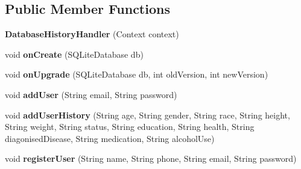 \subsection*{Public Member Functions}
\begin{DoxyCompactItemize}
\item 
{\bfseries Database\+History\+Handler} (Context context)\hypertarget{classcom_1_1example_1_1android_1_1wearable_1_1wcldemo_1_1helper_1_1DatabaseHistoryHandler_a862bdb105fc542bed99af9d6bf2f515b}{}\label{classcom_1_1example_1_1android_1_1wearable_1_1wcldemo_1_1helper_1_1DatabaseHistoryHandler_a862bdb105fc542bed99af9d6bf2f515b}

\item 
void {\bfseries on\+Create} (S\+Q\+Lite\+Database db)\hypertarget{classcom_1_1example_1_1android_1_1wearable_1_1wcldemo_1_1helper_1_1DatabaseHistoryHandler_a9aa7feccf53c557cbbfbd7faeacedbbf}{}\label{classcom_1_1example_1_1android_1_1wearable_1_1wcldemo_1_1helper_1_1DatabaseHistoryHandler_a9aa7feccf53c557cbbfbd7faeacedbbf}

\item 
void {\bfseries on\+Upgrade} (S\+Q\+Lite\+Database db, int old\+Version, int new\+Version)\hypertarget{classcom_1_1example_1_1android_1_1wearable_1_1wcldemo_1_1helper_1_1DatabaseHistoryHandler_a2dc3f304b9c320382c505e11c9fb1d0a}{}\label{classcom_1_1example_1_1android_1_1wearable_1_1wcldemo_1_1helper_1_1DatabaseHistoryHandler_a2dc3f304b9c320382c505e11c9fb1d0a}

\item 
void {\bfseries add\+User} (String email, String password)\hypertarget{classcom_1_1example_1_1android_1_1wearable_1_1wcldemo_1_1helper_1_1DatabaseHistoryHandler_aa03c0a6bc2f40a1c5a246e72b20865d2}{}\label{classcom_1_1example_1_1android_1_1wearable_1_1wcldemo_1_1helper_1_1DatabaseHistoryHandler_aa03c0a6bc2f40a1c5a246e72b20865d2}

\item 
void {\bfseries add\+User\+History} (String age, String gender, String race, String height, String weight, String status, String education, String health, String diagonised\+Disease, String medication, String alcohol\+Use)\hypertarget{classcom_1_1example_1_1android_1_1wearable_1_1wcldemo_1_1helper_1_1DatabaseHistoryHandler_a09a625e1ed0e997b42003a9816d2f882}{}\label{classcom_1_1example_1_1android_1_1wearable_1_1wcldemo_1_1helper_1_1DatabaseHistoryHandler_a09a625e1ed0e997b42003a9816d2f882}

\item 
void {\bfseries register\+User} (String name, String phone, String email, String password)\hypertarget{classcom_1_1example_1_1android_1_1wearable_1_1wcldemo_1_1helper_1_1DatabaseHistoryHandler_a053b99868e30a4493a2f8beda53e30dd}{}\label{classcom_1_1example_1_1android_1_1wearable_1_1wcldemo_1_1helper_1_1DatabaseHistoryHandler_a053b99868e30a4493a2f8beda53e30dd}


\end{DoxyCompactItemize}
